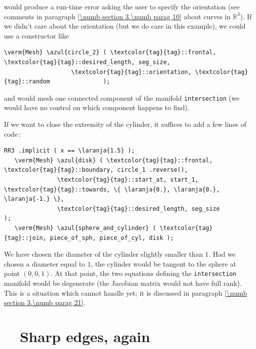\noindent would produce a run-time error asking the user to specify the orientation
(see comments in paragraph \ref{\numb section 3.\numb parag 10} about curves in $ \mathbb{R}^3 $).
If we didn't care about the orientation (but we do care in this example), we could use
a constructor like

\begin{Verbatim}[commandchars=\\\{\},formatcom=\small\tt,
   baselinestretch=0.94,framesep=2mm                     ]
   \verm{Mesh} \azul{circle_2} ( \textcolor{tag}{tag}::frontal, \textcolor{tag}{tag}::desired_length, seg_size,
                   \textcolor{tag}{tag}::orientation, \textcolor{tag}{tag}::random               );
\end{Verbatim}

\noindent and {\maniFEM} would mesh one connected component of the manifold {\small\tt intersection}
(we would have no control on which component {\maniFEM} happens to find).

If we want to close the extremity of the cylinder, it suffices to add a few lines of code$\,$:

\begin{Verbatim}[commandchars=\\\{\},formatcom=\small\tt,
   baselinestretch=0.94,framesep=2mm                     ]
   RR3 .implicit ( x == \laranja{1.5} );
   \verm{Mesh} \azul{disk} ( \textcolor{tag}{tag}::frontal, \textcolor{tag}{tag}::boundary, circle_1 .reverse(),
               \textcolor{tag}{tag}::start_at, start_1, \textcolor{tag}{tag}::towards, \{ \laranja{0.}, \laranja{0.}, \laranja{-1.} \},
               \textcolor{tag}{tag}::desired_length, seg_size                         );
   \verm{Mesh} \azul{sphere_and_cylinder} ( \textcolor{tag}{tag}::join, piece_of_sph, piece_of_cyl, disk );
\end{Verbatim}

We have chosen the diameter of the cylinder slightly smaller than $1$.
Had we chosen a diameter equal to $1$, the cylinder would be tangent to the sphere at point
$ (0,0,1) $.
At that point, the two equations defining the {\small\tt intersection} manifold would be
degenerate (the Jacobian matrix would not have full rank).
This is a situation which {\maniFEM} cannot handle yet; it is discussed in paragraph
\ref{\numb section 3.\numb parag 21}.


\section{~~Sharp edges, again}\label{\numb section 3.\numb parag 19}

